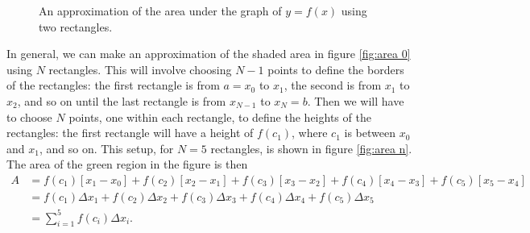 \documentclass{myarticle}
\theoremstyle{nospace}
\newtheorem{old series theorem}{Theorem}
\newenvironment{series theorem}
{\begin{mdframed}\begin{old series theorem}}
    {\end{old series theorem}\end{mdframed}}
\begin{document}
\begin{figure}[htb!] \centering
  \caption{An approximation of the area under the graph of $y = f(x)$
    using two rectangles.}
  \label{fig:area 2}
\end{figure}

In general, we can make an approximation of the shaded area in figure
\ref{fig:area 0} using $N$ rectangles. This will involve choosing
$N - 1$ points to define the borders of the rectangles: the first
rectangle is from $a = x_0$ to $x_1$, the second is from $x_1$ to
$x_2$, and so on until the last rectangle is from $x_{N - 1}$ to
$x_N = b$. Then we will have to choose $N$ points, one within each
rectangle, to define the heights of the rectangles: the first
rectangle will have a height of $f(c_1)$, where $c_1$ is between $x_0$
and $x_1$, and so on. This setup, for $N = 5$ rectangles, is shown in
figure \ref{fig:area n}. The area of the green region in the figure is
then
\begin{align*}
  A
  &= f(c_1)[x_1 - x_0]
    + f(c_2)[x_2 - x_1]
    + f(c_3)[x_3 - x_2]
    + f(c_4)[x_4 - x_3]
    + f(c_5)[x_5 - x_4] \\
  &= f(c_1)\Delta x_1
    + f(c_2)\Delta x_2
    + f(c_3)\Delta x_3
    + f(c_4)\Delta x_4
    + f(c_5)\Delta x_5 \\
  &= \sum_{i=1}^5 f(c_i)\Delta x_i.
\end{align*}
\end{document}
